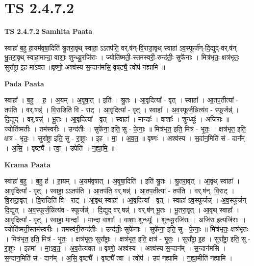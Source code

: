 \documentclass[17pt]{extarticle}
\begin{document}
\section{ TS 2.4.7.2 }

\textbf{TS 2.4.7.2 } \newline
\textbf{Samhita Paata} \newline

स्वाहा॑ ब॒हु हा॒यम॑वृषा॒दिति॑ श्रु॒तरा॒वृथ् स्वाहा॒ ऽऽतप॑ति॒ वर्.ष॑न्-वि॒राडा॒वृथ् स्वाहा॑ ऽव॒स्फूर्ज॑न्-दि॒द्युद्-वर्.ष॑न् भू॒तरा॒वृथ् स्वाहा॒मान्दा॒ वाशाः॒ शुन्ध्यू॒रजि॑राः । ज्योति॑ष्मती॒-स्तम॑स्वरी॒-रुन्द॑तीः॒ सुफे॑नाः । मित्र॑भृतः॒ क्षत्र॑भृतः॒ सुरा᳚ष्ट्रा इ॒ह मा॑ऽवत ॥वृष्णो॒ अश्व॑स्य स॒न्दान॑मसि॒ वृष्‌ट्यै॒ त्वोप॑ नह्यामि ॥ \newline

\textbf{Pada Paata} \newline

स्वाहा᳚ । ब॒हु । ह॒ । अ॒यम् । अ॒वृ॒षा॒त् । इति॑ । श्रु॒तः । आ॒वृदित्या᳚ - वृत् । स्वाहा᳚ । आ॒तप॒तीत्या᳚ - तप॑ति । वर्.षन्न्॑ । वि॒राडिति॑ वि - राट् । आ॒वृदित्या᳚ - वृत् । स्वाहा᳚ । अ॒व॒स्फूर्ज॒न्नित्य॑व - स्फूर्जन्न्॑ । दि॒द्युद् । वर्.षन्न्॑ । भू॒तः । आ॒वृदित्या᳚ - वृत् । स्वाहा᳚ । मान्दाः᳚ । वाशाः᳚ । शुन्ध्यूः᳚ । अजि॑राः ॥ ज्योति॑ष्मतीः । तम॑स्वरीः । उन्द॑तीः । सुफे॑ना॒ इति॒ सु - फे॒नाः॒ ॥ मित्र॑भृत॒ इति॒ मित्र॑ - भृ॒तः॒ । क्षत्र॑भृत॒ इति॒ क्षत्र॑ - भृ॒तः॒ । सुरा᳚ष्ट्रा॒ इति॒ सु - रा॒ष्ट्राः॒ । इ॒ह । मा॒ । अ॒व॒त॒ ॥ वृष्णः॑ । अश्व॑स्य । स॒दांन॒मिति॑ सं - दान᳚म् । अ॒सि॒ । वृष्ट्यै᳚ । त्वा॒ । उपेति॑ । न॒ह्या॒मि॒ ॥  \newline


\textbf{Krama Paata} \newline

स्वाहा॑ ब॒हु । ब॒हु ह॑ । हा॒यम् । अ॒यम॑वृषात् । अ॒वृ॒षा॒दिति॑ । इति॑ श्रु॒तः । श्रु॒तरा॒वृत् । आ॒वृथ् स्वाहा᳚ । आ॒वृदित्या᳚ - वृत् । स्वाहा॒ ऽऽतप॑ति । आ॒तप॑ति॒ वर्.षन्न्॑ । आ॒तप॒तीत्या᳚ - तप॑ति । वर्.ष॑न्. वि॒राट् । वि॒राडा॒वृत् । वि॒राडिति॑ वि - राट् । आ॒वृथ् स्वाहा᳚ । आ॒वृदित्या᳚ - वृत् । स्वाहा॑ ऽव॒स्फूर्जन्न्॑ । अ॒व॒स्फूर्ज॑न् दि॒द्युत् । अ॒व॒स्फूर्ज॒न्नित्य॑व - स्फूर्जन्न्॑ । दि॒द्युद् वर्.षन्न्॑ । वर्.ष॑न् भू॒तः । भू॒तरा॒वृत् । 
आ॒वृथ् स्वाहा᳚ । आ॒वृदित्या᳚ - वृत् । स्वाहा॒ मान्दाः᳚ । मान्दा॒ वाशाः᳚ । वाशाः॒ शुन्ध्यूः᳚ । शुन्ध्यू॒रजि॑राः । अजि॑रा॒ इत्यजि॑राः ॥ ज्योति॑ष्मती॒स्तम॑स्वरीः । तमस्व॑री॒रुन्द॑तीः । उन्द॑तीः॒ सुफे॑नाः । सुफे॑ना॒ इति॒ सु - फे॒नाः॒ ॥ मित्र॑भृतः॒ क्षत्र॑भृतः । मित्र॑भृत॒ इति॒ मित्र॑ - भृ॒तः॒ । क्षत्र॑भृतः॒ सुरा᳚ष्ट्राः । क्षत्र॑भृत॒ इति॒ क्षत्र॑ - भृ॒तः॒ । सुरा᳚ष्ट्रा इ॒ह । सुरा᳚ष्ट्रा॒ इति॒ सु - रा॒ष्ट्राः॒ । इ॒हमा᳚ । मा॒ऽव॒त॒ । अ॒व॒तेत्य॑वत ॥ वृष्णो॒ अश्व॑स्य । अश्व॑स्य स॒न्दान᳚म् । स॒न्दान॑मसि । स॒न्दान॒मिति॑ सं - दान᳚म् । अ॒सि॒ वृष्ट्यै᳚ । वृष्ट्यै᳚ त्वा । त्वोप॑ । उप॑ नह्यामि । 
न॒ह्या॒मीति॑ नह्यामि । \newline
\end{document}
